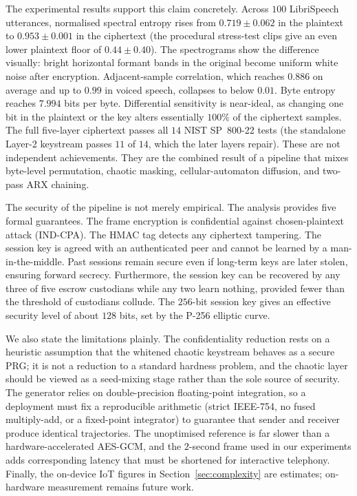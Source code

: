 \documentclass[pdflatex,sn-mathphys-num]{sn-jnl}%
\theoremstyle{thmstyleone}%
\theoremstyle{thmstyletwo}%
\theoremstyle{thmstylethree}%
\begin{document}
The experimental results support this claim concretely. Across $100$ LibriSpeech utterances, normalised spectral entropy rises from $0.719\pm0.062$ in the plaintext to $0.953\pm0.001$ in the ciphertext (the procedural stress-test clips give an even lower plaintext floor of $0.44\pm0.40$). The spectrograms show the difference visually: bright horizontal formant bands in the original become uniform white noise after encryption. Adjacent-sample correlation, which reaches $0.886$ on average and up to $0.99$ in voiced speech, collapses to below $0.01$. Byte entropy reaches $7.994$ bits per byte. Differential sensitivity is near-ideal, as changing one bit in the plaintext or the key alters essentially $100\%$ of the ciphertext samples. The full five-layer ciphertext passes all $14$ NIST SP~800-22 tests (the standalone Layer-2 keystream passes $11$ of $14$, which the later layers repair). These are not independent achievements. They are the combined result of a pipeline that mixes byte-level permutation, chaotic masking, cellular-automaton diffusion, and two-pass ARX chaining.

The security of the pipeline is not merely empirical. The analysis provides five formal guarantees. The frame encryption is confidential against chosen-plaintext attack (IND-CPA). The HMAC tag detects any ciphertext tampering. The session key is agreed with an authenticated peer and cannot be learned by a man-in-the-middle. Past sessions remain secure even if long-term keys are later stolen, ensuring forward secrecy. Furthermore, the session key can be recovered by any three of five escrow custodians while any two learn nothing, provided fewer than the threshold of custodians collude. The $256$-bit session key gives an effective security level of about $128$ bits, set by the P-256 elliptic curve.

We also state the limitations plainly. The confidentiality reduction rests on a heuristic assumption that the whitened chaotic keystream behaves as a secure PRG; it is not a reduction to a standard hardness problem, and the chaotic layer should be viewed as a seed-mixing stage rather than the sole source of security. The generator relies on double-precision floating-point integration, so a deployment must fix a reproducible arithmetic (strict IEEE-754, no fused multiply-add, or a fixed-point integrator) to guarantee that sender and receiver produce identical trajectories. The unoptimised reference is far slower than a hardware-accelerated AES-GCM, and the $2$-second frame used in our experiments adds corresponding latency that must be shortened for interactive telephony. Finally, the on-device IoT figures in Section~\ref{sec:complexity} are estimates; on-hardware measurement remains future work.
\end{document}
